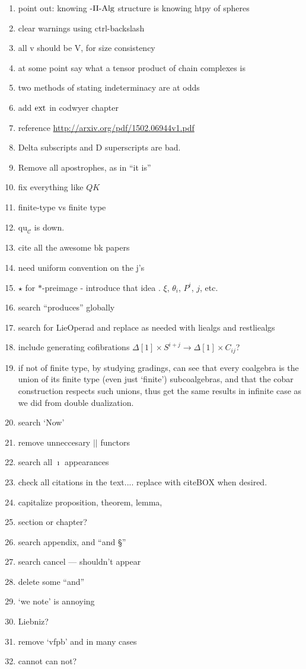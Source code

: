 \documentclass[11pt]{amsart} \renewcommand{\baselinestretch}{1.4}
\theoremstyle{plain}
\theoremstyle{definition}
\renewcommand{\to}{\longrightarrow}
\newcommand{\calc}{\mathcal{C}}
\newcommand{\quadratic}{\mathrm{qu}}
\newcommand{\diag}[1]{|#1|}
\begin{document}
\begin{todolist}
\begin{enumerate}
\item point out: knowing $\textup{-$\Pi$-Alg}$ structure is knowing htpy of spheres
\item clear warnings using ctrl-backslash
\item all \textup{v} should be \textup{V}, for size consistency
\item at some point say what a tensor product of chain complexes is
\item two methods of stating indeterminacy are at odds
\item add $\textup{ext}$ in codwyer chapter
\item reference \url{http://arxiv.org/pdf/1502.06944v1.pdf}
\item Delta subscripts and D superscripts are bad.
\item Remove all apostrophes, as in ``it is''
\item fix everything like $QK$
\item finite-type vs finite type
\item $\quadratic_\calc$ is down.
\item cite all the awesome bk papers
\item need uniform convention on the j's
\item $\star$ for $*$-preimage - introduce that idea . $\xi$, $\theta_i$, $P^i$, $j$, etc.
\item search ``produces'' globally
\item search for LieOperad and replace as needed with liealgs and restliealgs
\item include generating cofibrations $\Delta[1]\times S^{i+j}\to \Delta[1]\times C_{ij}$?
\item if not  of finite type, by studying gradings, can see that every coalgebra is the union of its finite type (even just `finite') subcoalgebras, and that the cobar construction respects such unions, thus get the same results in infinite case as we did from double dualization.
\item search `Now'
\item remove unneccesary $\diag{} $ functors
\item search all $\imath$ appearances
\item check all citations in the text.... replace with citeBOX when desired.
\item capitalize proposition, theorem, lemma, 
\item section or chapter?
\item search appendix, and ``and \S''
\item search cancel --- shouldn't appear
\item delete some ``and''
\item `we note' is annoying
\item Liebniz?
\item remove `vfpb' and \hfil in many cases
\item cannot can not?
\end{enumerate}
\end{todolist}
\begin{bibliog}
\printbibliography
\end{bibliog}
\end{document}
